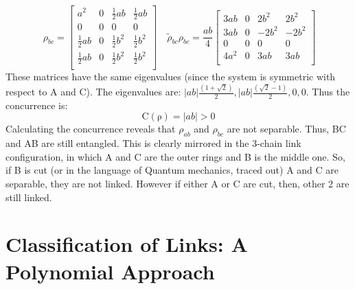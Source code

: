 \documentclass{scrartcl}
\begin{document}
    \begin{equation*}\
        \rho_{bc} =
        \left[
        \begin{array}{cccc}
        a^{2} & 0 & \frac{1}{2} a b & \frac{1}{2} a b \\[0.3cm]
        0 & 0 & 0 & 0 \\[0.3cm]
        \frac{1}{2} a b & 0 & \frac{1}{2} b^{2} & \frac{1}{2} b^{2} \\[0.3cm]
        \frac{1}{2} a b & 0 & \frac{1}{2} b^{2} & \frac{1}{2} b^{2} \\[0.3cm]
        \end{array}
        \right] \quad \tilde{\rho}_{bc}\rho_{bc} =\frac{ab}{4}\left[
            \begin{array}{cccc}
            3 a b& 0 & 2 b^{2} & 2 b^{2} \\[0.5cm]
           3 a b & 0 & -2 b^{2} & -2 b^{2} \\[0.5cm]
            0 & 0 & 0 & 0 \\[0.5cm]
            4 a^{2} & 0 & 3 a b& 3 a b\\[0.5cm]
            \end{array}
            \right]
        \end{equation*}
\noindent
These matrices have the same eigenvalues (since the system is symmetric with respect to A and C). The eigenvalues are: $|ab|\frac{(1 + \sqrt{2})}{2},|ab| \frac{(\sqrt{2} - 1)}{2},0,0$. Thus the concurrence is: $$\mathrm{C(\rho)} = |ab|>0$$
\noindent
Calculating the concurrence reveals that $\rho_{ab}$ and $\rho_{bc}$ are not separable. Thus, BC and AB are still entangled. This is clearly mirrored in the 3-chain link configuration, in which A and C are the outer rings and B is the middle one. So, if B is cut (or in the language of Quantum mechanics, traced out) A and C are separable, they are not linked. However if either A or C are cut, then, other 2 are still linked.


\section{Classification of Links: A Polynomial Approach}
\end{document}
